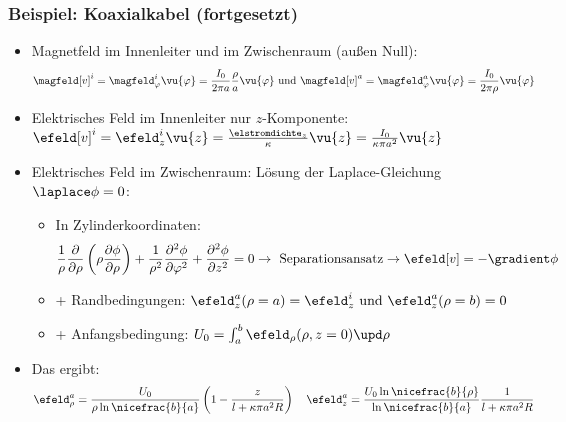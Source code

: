 \begin{frame}
  \frametitle{Beispiel: Koaxialkabel (fortgesetzt)}
\begin{itemize}[<+->]
\item Magnetfeld im Innenleiter und im Zwischenraum (außen Null):
  $$
  \magfeld[v]^i = \magfeld_\varphi^i \vu{\varphi} = \frac{I_0}{2\pi a}\frac{\rho}{a} \vu{\varphi} \text{ und } \magfeld[v]^a = \magfeld_\varphi^a \vu{\varphi} = \frac{I_0}{2\pi \rho} \vu{\varphi}
  $$
\item Elektrisches Feld im Innenleiter nur $z$-Komponente: $\efeld[v]^i=\efeld_z^i \vu{z} = \frac{\elstromdichte_z}{\kappa}\vu{z}=\frac{I_0}{\kappa\pi a^2}\vu{z}$
\item Elektrisches Feld im Zwischenraum: Lösung der Laplace-Gleichung $\laplace \phi =0$:
  \begin{itemize}[<+->]
  \item In Zylinderkoordinaten:
    $$
    \frac{1}{\rho}\frac{\partial}{\partial \rho}\left(\rho\frac{\partial \phi}{\partial \rho}\right) + \frac{1}{\rho^2}\frac{\partial^2 \phi}{\partial \varphi^2} + \frac{\partial^2 \phi}{\partial z^2} =0 \to \text{ Separationsansatz} \to \efeld[v] = -\gradient\phi
    $$
  \item + Randbedingungen: $\efeld_z^a(\rho=a) = \efeld_z^i \text{ und } \efeld_z^a(\rho=b) = 0$
    \item + Anfangsbedingung: $U_0=\int_a^b \efeld_\rho(\rho, z=0)\upd\rho$
    \end{itemize}
  \item Das ergibt:
    $$
    \efeld_\rho^a = \frac{U_0}{\rho \ln\nicefrac{b}{a}}\left(1-\frac{z}{l+\kappa\pi a^2 R}\right) \quad \efeld_z^a = \frac{U_0 \ln\nicefrac{b}{\rho}}{\ln\nicefrac{b}{a}}\frac{1}{l+\kappa\pi a^2 R} 
    $$
  \end{itemize}
\end{frame}

